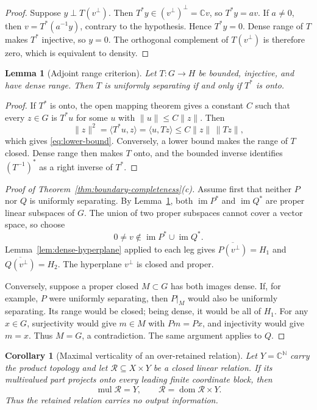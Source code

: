 \documentclass[11pt]{article}
\newtheorem{corollary}[theorem]{Corollary}
\newtheorem{lemma}[theorem]{Lemma}
\theoremstyle{definition}
\theoremstyle{remark}
\newcommand{\C}{\mathbb C}
\newcommand{\N}{\mathbb N}
\newcommand{\im}{\operatorname{im}}
\begin{document}
\begin{proof}
Suppose \(y\perp T(v^\perp)\).  Then \(T^*y\in(v^\perp)^\perp=\C v\),
so \(T^*y=av\).  If \(a\ne0\), then
\(v=T^*(a^{-1}y)\), contrary to the hypothesis.  Hence \(T^*y=0\).
Dense range of \(T\) makes \(T^*\) injective, so \(y=0\).  The orthogonal
complement of \(T(v^\perp)\) is therefore zero, which is equivalent to
density.
\end{proof}

\begin{lemma}[Adjoint range criterion]
\label{lem:adjoint-lower}
Let \(T:G\to H\) be bounded, injective, and have dense range.  Then
\(T\) is uniformly separating if and only if \(T^*\) is onto.
\end{lemma}

\begin{proof}
If \(T^*\) is onto, the open mapping theorem gives a constant \(C\) such
that every \(z\in G\) is \(T^*u\) for some \(u\) with
\(\|u\|\le C\|z\|\).  Then
\[
 \|z\|^2=\langle T^*u,z\rangle
          =\langle u,Tz\rangle
          \le C\|z\|\,\|Tz\|,
\]
which gives \eqref{eq:lower-bound}.  Conversely, a lower bound makes the
range of \(T\) closed.  Dense range then makes \(T\) onto, and the bounded
inverse identifies \((T^{-1})^*\) as a right inverse of \(T^*\).
\end{proof}

\begin{proof}[Proof of Theorem~\ref{thm:boundary-completeness}(c)]
Assume first that neither \(P\) nor \(Q\) is uniformly separating.  By
Lemma~\ref{lem:adjoint-lower}, both \(\im P^*\) and \(\im Q^*\) are proper
linear subspaces of \(G\).  The union of two proper subspaces cannot cover a
vector space, so choose
\[
                  0\ne v\notin\im P^*\cup\im Q^*.
\]
Lemma~\ref{lem:dense-hyperplane} applied to each leg gives
\(\overline{P(v^\perp)}=H_1\) and
\(\overline{Q(v^\perp)}=H_2\).  The hyperplane \(v^\perp\) is closed and
proper.

Conversely, suppose a proper closed \(M\subset G\) has both images dense.
If, for example, \(P\) were uniformly separating, then
\(P|_M\) would also be uniformly separating.  Its range would be closed;
being dense, it would be all of \(H_1\).  For any \(x\in G\), surjectivity
would give \(m\in M\) with \(Pm=Px\), and injectivity would give \(m=x\).
Thus \(M=G\), a contradiction.  The same argument applies to \(Q\).
\end{proof}

\begin{corollary}[Maximal verticality of an over-retained relation]
\label{cor:maximal-verticality}
Let \(Y=\C^{\N}\) carry the product topology and let
\(\mathcal R\subseteq X\times Y\) be a closed linear relation.  If its
multivalued part projects onto every leading finite coordinate block, then
\[
                 \operatorname{mul}\mathcal R=Y,
                 \qquad
                 \mathcal R=\operatorname{dom}\mathcal R\times Y.
\tag{4.1}\label{eq:maximal-vertical}
\]
Thus the retained relation carries no output information.
\end{corollary}
\end{document}
